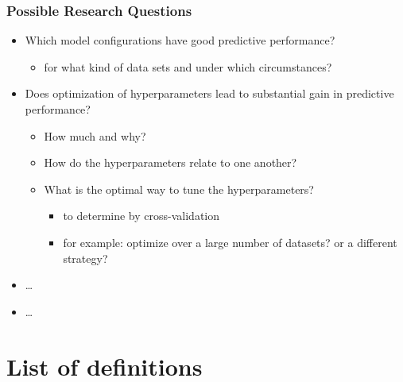 \documentclass[
]{book}
\providecommand{\tightlist}{%
  \setlength{\itemsep}{0pt}\setlength{\parskip}{0pt}}
\begin{document}
\hypertarget{possible-research-questions}{%
\subsection{Possible Research Questions}\label{possible-research-questions}}

\begin{itemize}
\tightlist
\item
  Which model configurations have good predictive performance?

  \begin{itemize}
  \tightlist
  \item
    for what kind of data sets and under which circumstances?
  \end{itemize}
\item
  Does optimization of hyperparameters lead to substantial gain in predictive performance?

  \begin{itemize}
  \tightlist
  \item
    How much and why?
  \item
    How do the hyperparameters relate to one another?
  \item
    What is the optimal way to tune the hyperparameters?

    \begin{itemize}
    \tightlist
    \item
      to determine by cross-validation
    \item
      for example: optimize over a large number of datasets? or a different strategy?
    \end{itemize}
  \end{itemize}
\item
  \ldots{}
\item
  \ldots{}
\end{itemize}

\hypertarget{appendix-appendix}{%
\appendix}


\hypertarget{list-of-definitions}{%
\chapter{List of definitions}\label{list-of-definitions}}
\end{document}
